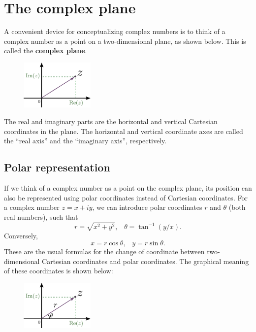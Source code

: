 \documentclass[10pt,a4paper]{article}
\begin{document}
\section{The complex plane}\label{the-complex-plane}

A convenient device for conceptualizing complex numbers is to think of
a complex number as a point on a two-dimensional plane, as shown
below.  This is called the \textbf{complex plane}.
\pagebreak
\begin{figure}[h]
  \centering\includegraphics[width=0.32\textwidth]{complex_plane}
\end{figure}

\noindent
The real and imaginary parts are the horizontal and vertical Cartesian
coordinates in the plane. The horizontal and vertical coordinate axes
are called the ``real axis'' and the ``imaginary axis'', respectively.

\subsection{Polar representation}\label{polar-representation}

If we think of a complex number as a point on the complex plane, its
position can also be represented using polar coordinates instead of
Cartesian coordinates. For a complex number $z = x + i y$, we can
introduce polar coordinates $r$ and $\theta$ (both real numbers), such
that
\begin{equation}
  r = \sqrt{x^2 + y^2}, \;\;\; \theta = \tan^{-1}(y/x).
\end{equation}
Conversely,
\begin{equation}
  x = r\cos\theta, \;\;\; y = r\sin\theta.
\end{equation}
These are the usual formulas for the change of coordinate between
two-dimensional Cartesian coordinates and polar coordinates.  The
graphical meaning of these coordinates is shown below:

\begin{figure}[h]
  \centering\includegraphics[width=0.32\textwidth]{complex_plane2}
\end{figure}
\end{document}
